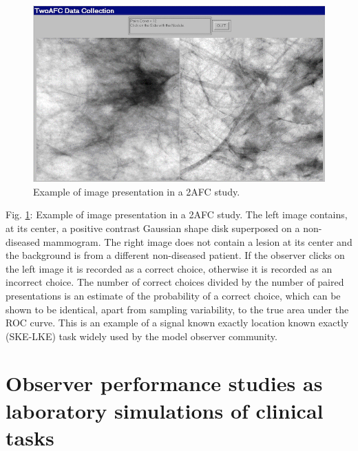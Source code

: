 \documentclass[
]{book}
\begin{document}
\begin{figure}
\includegraphics[width=10in]{images/2AFC} \caption{Example of image presentation in a 2AFC study.}\label{fig:2AFC}
\end{figure}

Fig. \ref{fig:2AFC}: Example of image presentation in a 2AFC study. The left image contains, at its center, a positive contrast Gaussian shape disk superposed on a non-diseased mammogram. The right image does not contain a lesion at its center and the background is from a different non-diseased patient. If the observer clicks on the left image it is recorded as a correct choice, otherwise it is recorded as an incorrect choice. The number of correct choices divided by the number of paired presentations is an estimate of the probability of a correct choice, which can be shown to be identical, apart from sampling variability, to the true area under the ROC curve. This is an example of a signal known exactly location known exactly (SKE-LKE) task widely used by the model observer community.

\hypertarget{binary-task-observer-studies-as-simulations}{%
\section{Observer performance studies as laboratory simulations of clinical tasks}\label{binary-task-observer-studies-as-simulations}}
\end{document}
